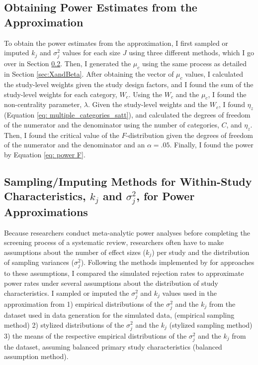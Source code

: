 \subsection{Obtaining Power Estimates from the Approximation}

To obtain the power estimates from the approximation, I first sampled or imputed $k_j$ and $\sigma_j^2$ values for each size $J$ using three different methods, which I go over in Section \ref{sec: sampling}. Then, I generated the $\mu_c$ using the same process as detailed in Section \ref{sec:XandBeta}. After obtaining the vector of $\mu_c$ values, I calculated the study-level weights given the study design factors, and I found the sum of the study-level weights for each category, $W_c$. Using the $W_c$ and the $\mu_c$, I found the non-centrality parameter, $\lambda$. Given the study-level weights and the $W_c$, I found $\eta_z$ (Equation \ref{eq: multiple_categories_satt}), and calculated the degrees of freedom of the numerator and the denominator using the number of categories, $C$, and $\eta_z$. Then, I found the critical value of the $F$-distribution  given the degrees of freedom of the numerator and the denominator and an $\alpha=.05$. Finally, I found the power by Equation \ref{eq: power F}.



\subsection{Sampling/Imputing Methods for Within-Study Characteristics, $k_j$ and $\sigma^2_j$, for Power Approximations} \label{sec: sampling}

Because researchers conduct meta-analytic power analyses before completing the screening process of a systematic review, researchers often have to make assumptions about the number of effect sizes ($k_j$) per study and the distribution of sampling variances ($\sigma_j^2$). Following the methods implemented by \textcite{vembye2023} for approaches to these assumptions, I compared the simulated rejection rates to approximate power rates under several assumptions about the distribution of study characteristics. I sampled or imputed the $\sigma_j^2$ and $k_j$ values used in the approximation from 1) empirical distributions of the $\sigma_j^2$ and the $k_j$ from the dataset used in data generation for the simulated data, \textcite{WilliamsRyan2022HiMI} (empirical sampling method) 2) stylized distributions of the $\sigma_j^2$ and the $k_j$ (stylized sampling method) 3) the means of the respective empirical distributions of the $\sigma_j^2$ and the $k_j$ from the \textcite{WilliamsRyan2022HiMI} dataset, assuming balanced primary study characteristics (balanced assumption method). 

